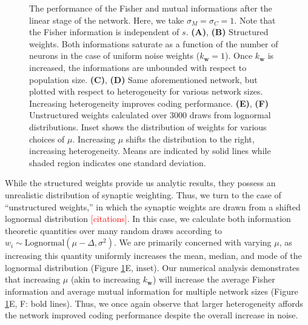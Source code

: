 \documentclass[11pt]{article}
\begin{document}
\begin{figure}[t]
		\caption{The performance of the Fisher and mutual informations after the linear stage of the network. Here, we take $\sigma_M = \sigma_C=1$. Note that the Fisher information is independent of $s$. \textbf{(A)}, \textbf{(B)} Structured weights. Both informations saturate as a function of the number of neurons in the case of uniform noise weights ($k_{\mathbf{w}}=1$). Once $k_{\mathbf{w}}$ is increased, the informations are unbounded with respect to population size. \textbf{(C)}, \textbf{(D)} Same aforementioned network, but plotted with respect to heterogeneity for various network sizes. Increasing heterogeneity improves coding performance. \textbf{(E)}, \textbf{(F)} Unstructured weights calculated over 3000 draws from lognormal distributions. Inset shows the distribution of weights for various choices of $\mu$. Increasing $\mu$ shifts the distribution to the right, increasing heterogeneity. Means are indicated by solid lines while shaded region indicates one standard deviation.}\label{fig:struct-linear}
	\end{figure}
	
	While the structured weights provide us analytic results, they possess an unrealistic distribution of synaptic weighting. Thus, we turn to the case of ``unstructured weights,'' in which the synaptic weights are drawn from a shifted lognormal distribution \textcolor{red}{[citations]}. In this case, we calculate both information theoretic quantities over many random draws according to $w_i \sim \text{Lognormal}(\mu - \Delta, \sigma^2)$. We are primarily concerned with varying $\mu$, as increasing this quantity uniformly increases the mean, median, and mode of the lognormal distribution (Figure  \ref{fig:struct-linear}E, inset). Our numerical analysis demonstrates that increasing $\mu$ (akin to increasing $k_{\mathbf{w}}$) will increase the average Fisher information and average mutual information for multiple network sizes (Figure \ref{fig:struct-linear}E, F: bold lines). Thus, we once again observe that larger heterogeneity affords the network improved coding performance despite the overall increase in noise.
\end{document}
